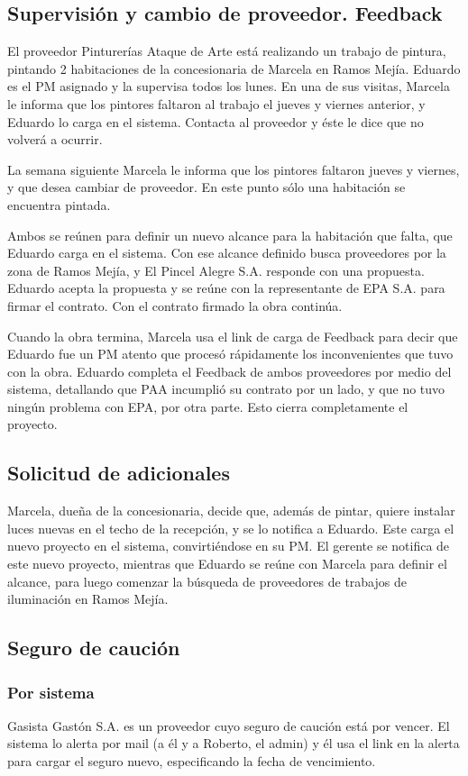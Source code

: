\subsection{Supervisión y cambio de proveedor. Feedback}
El proveedor Pinturerías Ataque de Arte está realizando un trabajo de pintura, pintando 2 habitaciones de la concesionaria de Marcela en Ramos Mejía. Eduardo es el PM asignado y la supervisa todos los lunes. En una de sus visitas, Marcela le informa que los pintores faltaron al trabajo el jueves y viernes anterior, y Eduardo lo carga en el sistema. Contacta al proveedor y éste le dice que no volverá a ocurrir.

La semana siguiente Marcela le informa que los pintores faltaron jueves y viernes, y que desea cambiar de proveedor. En este punto sólo una habitación se encuentra pintada.

Ambos se reúnen para definir un nuevo alcance para la habitación que falta, que Eduardo carga en el sistema. Con ese alcance definido busca proveedores por la zona de Ramos Mejía, y El Pincel Alegre S.A. responde con una propuesta. Eduardo acepta la propuesta y se reúne con la representante de EPA S.A. para firmar el contrato. Con el contrato firmado la obra continúa.

Cuando la obra termina, Marcela usa el link de carga de Feedback para decir que Eduardo fue un PM atento que procesó rápidamente los inconvenientes que tuvo con la obra. Eduardo completa el Feedback de ambos proveedores por medio del sistema, detallando que PAA incumplió su contrato por un lado, y que no tuvo ningún problema con EPA, por otra parte. Esto cierra completamente el proyecto.

\subsection{Solicitud de adicionales}
Marcela, dueña de la concesionaria, decide que, además de pintar, quiere instalar luces nuevas en el techo de la recepción, y se lo notifica a Eduardo. Este carga el nuevo proyecto en el sistema, convirtiéndose en su PM. El gerente se notifica de este nuevo proyecto, mientras que Eduardo se reúne con Marcela para definir el alcance, para luego comenzar la búsqueda de proveedores de trabajos de iluminación en Ramos Mejía.

\subsection{Seguro de caución}
\subsubsection{Por sistema}
Gasista Gastón S.A. es un proveedor cuyo seguro de caución está por vencer. El sistema lo alerta por mail (a él y a Roberto, el admin) y él usa el link en la alerta para cargar el seguro nuevo, especificando la fecha de vencimiento.

